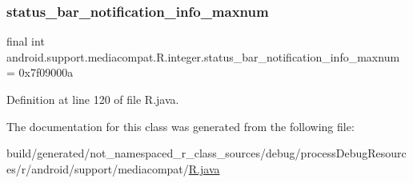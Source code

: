 \subsubsection{\texorpdfstring{status\_bar\_notification\_info\_maxnum}{status\_bar\_notification\_info\_maxnum}}
{\footnotesize\ttfamily final int android.\+support.\+mediacompat.\+R.\+integer.\+status\+\_\+bar\+\_\+notification\+\_\+info\+\_\+maxnum = 0x7f09000a\hspace{0.3cm}{\ttfamily [static]}}



Definition at line 120 of file R.\+java.



The documentation for this class was generated from the following file\+:\begin{DoxyCompactItemize}
\item 
build/generated/not\+\_\+namespaced\+\_\+r\+\_\+class\+\_\+sources/debug/process\+Debug\+Resources/r/android/support/mediacompat/\mbox{\hyperlink{android_2support_2mediacompat_2_r_8java}{R.\+java}}\end{DoxyCompactItemize}
